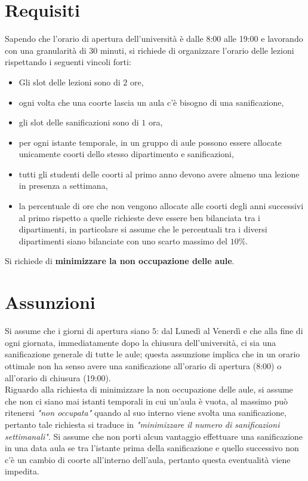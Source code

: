 \documentclass[12pt, italian, openany]{book}
\begin{document}
\section{Requisiti}
Sapendo che l'orario di apertura dell'università è dalle 8:00 alle 19:00 e lavorando con una granularità di 30 minuti, si richiede di organizzare l'orario delle lezioni rispettando i seguenti vincoli forti:
\begin{itemize}
\item Gli slot delle lezioni sono di $2$ ore,
\item ogni volta che una coorte lascia un aula c'è bisogno di una sanificazione,
\item gli slot delle sanificazioni sono di $1$ ora,
\item per ogni istante temporale, in un gruppo di aule possono essere allocate unicamente coorti dello stesso dipartimento e sanificazioni,
\item tutti gli studenti delle coorti al primo anno devono avere almeno una lezione in presenza a settimana,
\item la percentuale di ore che non vengono allocate alle coorti degli anni successivi al primo rispetto a quelle richieste deve essere ben bilanciata tra i dipartimenti, in particolare si assume che le percentuali tra i diversi dipartimenti siano bilanciate con uno scarto massimo del $10 \% $.
\end{itemize}
Si richiede di \textbf{minimizzare la non occupazione delle aule}.

\section{Assunzioni}
Si assume che i giorni di apertura siano $5$: dal Lunedì al Venerdì e che alla fine di ogni giornata, immediatamente dopo la chiusura dell'università, ci sia una sanificazione generale di tutte le aule; questa assunzione implica che in un orario ottimale non ha senso avere una sanificazione all'orario di apertura (8:00) o all'orario di chiusura (19:00).\\
Riguardo alla richiesta di minimizzare la non occupazione delle aule, si assume che non ci siano mai istanti temporali in cui un'aula è vuota, al massimo può ritenersi \textit{"non occupata"} quando al suo interno viene svolta una sanificazione, pertanto tale richiesta si traduce in \textit{"minimizzare il numero di sanificazioni settimanali"}.
Si assume che non porti alcun vantaggio effettuare una sanificazione in una data aula se tra l'istante prima della sanificazione e quello successivo non c'è un cambio di coorte all'interno dell'aula, pertanto questa eventualità viene impedita.
\end{document}
